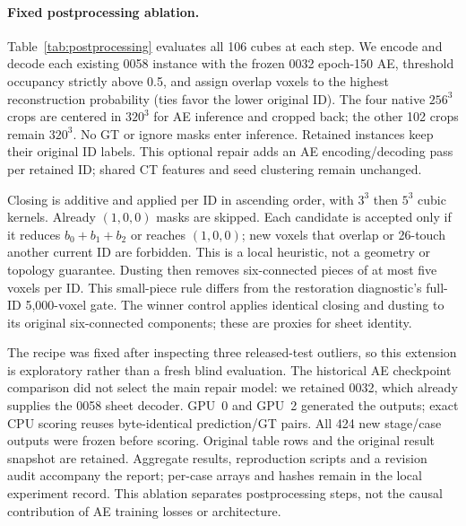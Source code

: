 \paragraph{Fixed postprocessing ablation.}
Table~\ref{tab:postprocessing} evaluates all 106 cubes at each step. We encode
and decode each existing 0058 instance with the frozen 0032 epoch-150 AE,
threshold occupancy strictly above 0.5, and assign overlap voxels to the
highest reconstruction probability (ties favor the lower original ID).
The four native $256^3$ crops are centered in $320^3$ for AE inference and
cropped back; the other 102 crops remain $320^3$. No GT or ignore masks enter
inference. Retained instances keep their original ID labels.
This optional repair adds an AE encoding/decoding pass per retained ID;
shared CT features and seed clustering remain unchanged.

Closing is additive and applied per ID in ascending order, with $3^3$ then
$5^3$ cubic kernels. Already $(1,0,0)$ masks are skipped. Each candidate is
accepted only if it reduces $b_0+b_1+b_2$ or reaches $(1,0,0)$; new voxels
that overlap or 26-touch another current ID are forbidden. This is a local
heuristic, not a geometry or topology guarantee. Dusting then removes
six-connected pieces of at most five voxels per ID. This small-piece rule
differs from the restoration diagnostic's full-ID 5,000-voxel gate.
The winner control applies identical closing and dusting to its original
six-connected components; these are proxies for sheet identity.

The recipe was fixed after inspecting three released-test outliers, so this
extension is exploratory rather than a fresh blind evaluation. The historical
AE checkpoint comparison did not select the main repair model: we retained
0032, which already supplies the 0058 sheet decoder. GPU~0 and GPU~2 generated
the outputs; exact CPU scoring reuses byte-identical prediction/GT pairs.
All 424 new stage/case outputs were frozen before scoring. Original table rows
and the original result snapshot are retained. Aggregate results, reproduction
scripts and a revision audit accompany the report; per-case arrays and hashes
remain in the local experiment record. This ablation separates postprocessing
steps, not the causal contribution of AE training losses or architecture.



